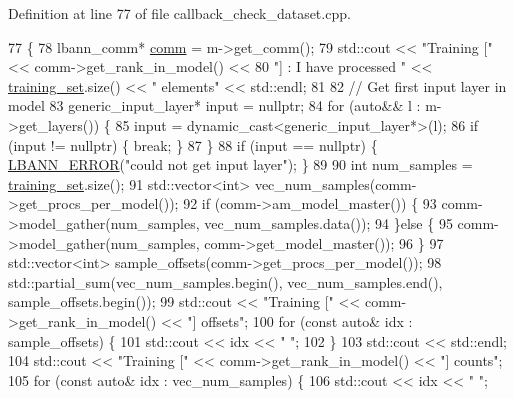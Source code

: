 Definition at line 77 of file callback\+\_\+check\+\_\+dataset.\+cpp.


\begin{DoxyCode}
77                                                         \{
78   lbann\_comm* \hyperlink{file__io_8cpp_ab048c6f9fcbcfaa57ce68b00263dbebe}{comm} = m->get\_comm();
79   std::cout << \textcolor{stringliteral}{"Training ["} << comm->get\_rank\_in\_model() <<
80     \textcolor{stringliteral}{"] : I have processed "} << \hyperlink{classlbann_1_1lbann__callback__check__dataset_a22d16efa2ec47759766f2f7478b11059}{training\_set}.size() << \textcolor{stringliteral}{" elements"} << std::endl;
81 
82   \textcolor{comment}{// Get first input layer in model}
83   generic\_input\_layer* input = \textcolor{keyword}{nullptr};
84   \textcolor{keywordflow}{for} (\textcolor{keyword}{auto}&& l : m->get\_layers()) \{
85     input = \textcolor{keyword}{dynamic\_cast<}generic\_input\_layer*\textcolor{keyword}{>}(l);
86     \textcolor{keywordflow}{if} (input != \textcolor{keyword}{nullptr}) \{ \textcolor{keywordflow}{break}; \}
87   \}
88   \textcolor{keywordflow}{if} (input == \textcolor{keyword}{nullptr}) \{ \hyperlink{base_8hpp_a80b1d707117e968a6951b7222e4b2b87}{LBANN\_ERROR}(\textcolor{stringliteral}{"could not get input layer"}); \}
89 
90   \textcolor{keywordtype}{int} num\_samples = \hyperlink{classlbann_1_1lbann__callback__check__dataset_a22d16efa2ec47759766f2f7478b11059}{training\_set}.size();
91   std::vector<int> vec\_num\_samples(comm->get\_procs\_per\_model());
92   \textcolor{keywordflow}{if} (comm->am\_model\_master()) \{
93     comm->model\_gather(num\_samples, vec\_num\_samples.data());
94   \}\textcolor{keywordflow}{else} \{
95     comm->model\_gather(num\_samples, comm->get\_model\_master());
96   \}
97   std::vector<int> sample\_offsets(comm->get\_procs\_per\_model());
98   std::partial\_sum(vec\_num\_samples.begin(), vec\_num\_samples.end(), sample\_offsets.begin());
99   std::cout << \textcolor{stringliteral}{"Training ["} << comm->get\_rank\_in\_model() << \textcolor{stringliteral}{"] offsets"};
100   \textcolor{keywordflow}{for} (\textcolor{keyword}{const} \textcolor{keyword}{auto}& idx : sample\_offsets) \{
101     std::cout << idx << \textcolor{stringliteral}{" "};
102   \}
103   std::cout << std::endl;
104   std::cout << \textcolor{stringliteral}{"Training ["} << comm->get\_rank\_in\_model() << \textcolor{stringliteral}{"] counts"};
105   \textcolor{keywordflow}{for} (\textcolor{keyword}{const} \textcolor{keyword}{auto}& idx : vec\_num\_samples) \{
106     std::cout << idx << \textcolor{stringliteral}{" "};

\end{DoxyCode}
